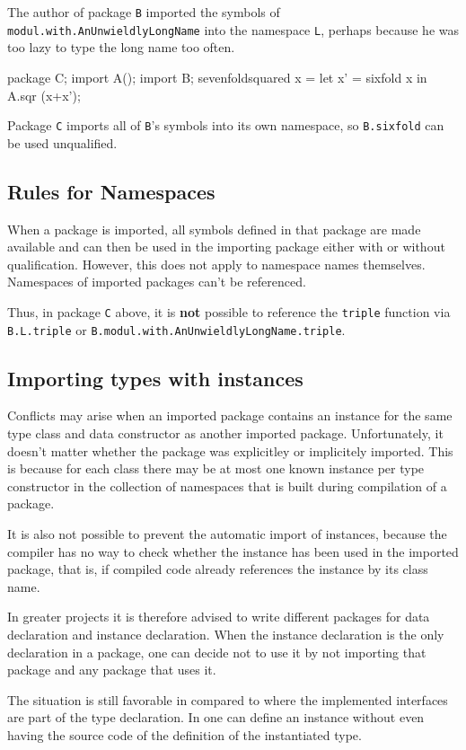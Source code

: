 The author of package {\tt B} imported the symbols of {\tt
modul.with.AnUnwieldlyLongName} into the namespace {\tt L},
perhaps because he was too lazy to type the long name too often.


\begin{code}
package C;
import A();
import B;
sevenfoldsquared x =
    let
        x' = sixfold x
    in A.sqr (x+x');
\end{code}

Package {\tt C} imports all of {\tt B}'s symbols into its own
namespace, so {\tt B.sixfold} can be used unqualified.

\subsection{Rules for Namespaces}

When a package is imported, all symbols defined in that package are made
available and can then be used in the importing package either
with or without qualification.
However, this does not apply to namespace names themselves. Namespaces of imported packages can't be referenced.

Thus,
in package {\tt C} above, it is {\bf not} possible to reference the
{\tt triple} function via {\tt B.L.triple} or
{\tt B.modul.with.AnUnwieldlyLongName.triple}.


\subsection{Importing types with instances}

Conflicts may arise when an imported package contains an instance for
the same type class and data constructor as another imported package.
Unfortunately, it doesn't matter whether the package was explicitley or
implicitely imported. This is
because for each class there may be at most one
known instance per type constructor in the collection of namespaces that
is built during compilation of a package.

It is also not possible to prevent the automatic import of instances,
because the compiler has no way to check whether the instance has been
used in the imported package, that is, if compiled code already
references the instance by its \java{} class name.

In greater projects it is therefore advised to write different packages
for data declaration and instance declaration. When the instance
declaration is the only declaration in a package, one can decide not to
use it by not importing that package and any package that uses it.

The situation is still favorable in \frege{} compared to \java{} where
the implemented interfaces are part of the type declaration. In \frege{}
one can define an instance without even having the source code of the
definition of the instantiated type.
